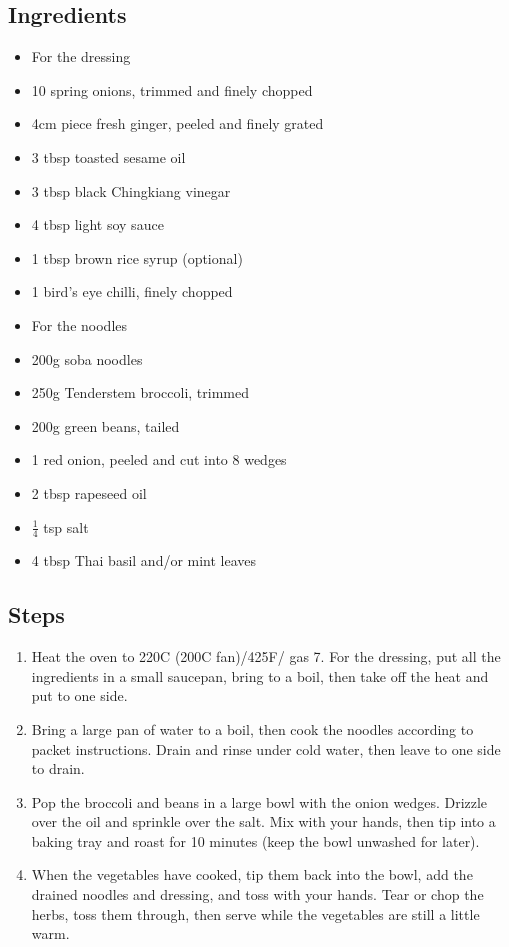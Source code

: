 \documentclass{book}
\begin{document}
\subsection*{Ingredients}
\begin{itemize}
\item For the dressing
\item 10 spring onions, trimmed and finely chopped
\item 4cm piece fresh ginger, peeled and finely grated
\item 3 tbsp toasted sesame oil
\item 3 tbsp black Chingkiang vinegar
\item 4 tbsp light soy sauce
\item 1 tbsp brown rice syrup (optional)
\item 1 bird’s eye chilli, finely chopped
\end{itemize}

\begin{itemize}
\item For the noodles
\item 200g soba noodles
\item 250g Tenderstem broccoli, trimmed
\item 200g green beans, tailed
\item 1 red onion, peeled and cut into 8 wedges
\item 2 tbsp rapeseed oil
\item $\frac{1}{4}$ tsp salt
\item 4 tbsp Thai basil and/or mint leaves
\end{itemize}

\subsection*{Steps}
\begin{enumerate}
\item Heat the oven to 220C (200C fan)/425F/ gas 7. For the dressing, put all the ingredients in a small saucepan, bring to a boil, then take off the heat and put to one side.
\item Bring a large pan of water to a boil, then cook the noodles according to packet instructions. Drain and rinse under cold water, then leave to one side to drain.
\item Pop the broccoli and beans in a large bowl with the onion wedges. Drizzle over the oil and sprinkle over the salt. Mix with your hands, then tip into a baking tray and roast for 10 minutes (keep the bowl unwashed for later).
\item When the vegetables have cooked, tip them back into the bowl, add the drained noodles and dressing, and toss with your hands. Tear or chop the herbs, toss them through, then serve while the vegetables are still a little warm.
\end{enumerate}
\newpage
\end{document}
